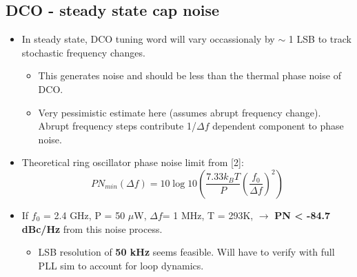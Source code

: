 \documentclass[10pt,a4paper]{article}
\begin{document}
		\subsection{DCO - steady state cap noise}
		\begin{minipage}{7cm}
			\vspace{1em}
			\begin{itemize}
				\scriptsize
				\item In steady state, DCO tuning word will vary occassionaly by $\sim$ 1 LSB to track stochastic frequency changes.
				\begin{itemize}
					\tiny
					\item This generates noise and should be less than the thermal phase noise of DCO.		
					\item Very pessimistic estimate here (assumes abrupt frequency change). Abrupt frequency steps contribute 1/$\Delta f$ dependent component to phase noise.
				\end{itemize} 
				\item Theoretical ring oscillator phase noise limit from [2]:
				\tiny
				\begin{equation}
					PN_{min}(\Delta f)= 10\log 10\left(\frac{7.33k_BT}{P}\left(\frac{f_0}{\Delta f}\right)^2\right)
				\end{equation}
				\scriptsize
				\item If $f_0$ = 2.4 GHz, P = 50 $\mu$W, $\Delta f$= 1 MHz, T = 293K, $\rightarrow$ \textbf{PN < -84.7 dBc/Hz} from this noise process.
				\begin{itemize}
					\scriptsize			
					\item LSB resolution of \textbf{50 kHz} seems feasible. Will have to verify with full PLL sim to account for loop dynamics.
				\end{itemize} 
			\end{itemize}  
		\end{minipage}%
\end{document}
